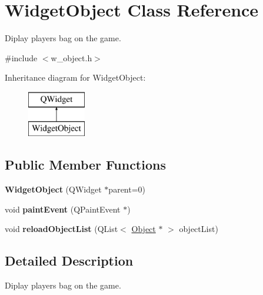 \hypertarget{class_widget_object}{}\section{Widget\+Object Class Reference}
\label{class_widget_object}


Diplay player\textquotesingle{}s bag on the game.  




{\ttfamily \#include $<$w\+\_\+object.\+h$>$}

Inheritance diagram for Widget\+Object\+:\begin{figure}[H]
\begin{center}
\leavevmode
\includegraphics[height=2.000000cm]{class_widget_object}
\end{center}
\end{figure}
\subsection*{Public Member Functions}
\begin{DoxyCompactItemize}
\item 
\hypertarget{class_widget_object_a9afd6dc40c5f86a62260aab7da90240d}{}{\bfseries Widget\+Object} (Q\+Widget $\ast$parent=0)\label{class_widget_object_a9afd6dc40c5f86a62260aab7da90240d}

\item 
\hypertarget{class_widget_object_a60fa184f747fa815ff6b1604b16dfb01}{}void {\bfseries paint\+Event} (Q\+Paint\+Event $\ast$)\label{class_widget_object_a60fa184f747fa815ff6b1604b16dfb01}

\item 
\hypertarget{class_widget_object_ab94d05b6395226aa5e06a6a551c0ee47}{}void {\bfseries reload\+Object\+List} (Q\+List$<$ \hyperlink{class_object}{Object} $\ast$ $>$ object\+List)\label{class_widget_object_ab94d05b6395226aa5e06a6a551c0ee47}

\end{DoxyCompactItemize}


\subsection{Detailed Description}
Diplay player\textquotesingle{}s bag on the game. 

